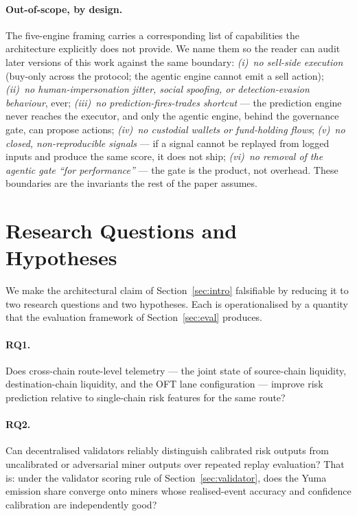 \documentclass[11pt,a4paper]{article}
\begin{document}
\paragraph{Out-of-scope, by design.} The five-engine framing carries a corresponding
list of capabilities the architecture explicitly does not provide. We name them so
the reader can audit later versions of this work against the same boundary:
\emph{(i)~no sell-side execution} (buy-only across the protocol; the agentic engine
cannot emit a sell action); \emph{(ii)~no human-impersonation jitter, social
spoofing, or detection-evasion behaviour}, ever; \emph{(iii)~no
prediction-fires-trades shortcut} --- the prediction engine never reaches the
executor, and only the agentic engine, behind the governance gate, can propose
actions; \emph{(iv)~no custodial wallets or fund-holding flows}; \emph{(v)~no
closed, non-reproducible signals} --- if a signal cannot be replayed from logged
inputs and produce the same score, it does not ship; \emph{(vi)~no removal of the
agentic gate ``for performance''} --- the gate is the product, not overhead. These
boundaries are the invariants the rest of the paper assumes.

\section{Research Questions and Hypotheses}\label{sec:rq}

We make the architectural claim of Section~\ref{sec:intro} falsifiable by reducing it to
two research questions and two hypotheses. Each is operationalised by a quantity that the
evaluation framework of Section~\ref{sec:eval} produces.

\paragraph{RQ1.} Does cross-chain route-level telemetry --- the joint state of source-chain
liquidity, destination-chain liquidity, and the OFT lane configuration --- improve risk
prediction relative to single-chain risk features for the same route?

\paragraph{RQ2.} Can decentralised validators reliably distinguish calibrated risk
outputs from uncalibrated or adversarial miner outputs over repeated replay evaluation?
That is: under the validator scoring rule of Section~\ref{sec:validator}, does the Yuma
emission share converge onto miners whose realised-event accuracy and confidence
calibration are independently good?
\end{document}
